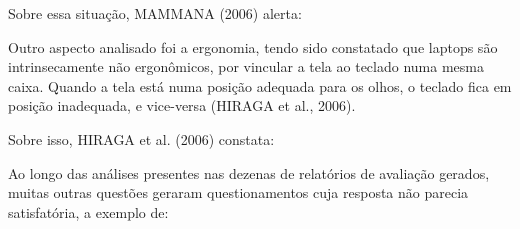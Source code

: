 \documentclass[
12pt,		%
openright,	%
twoside,  %
a4paper,			%
chapter=TITLE,		%
english,			%
french,				%
spanish,			%
brazil				%
]{USPSC-classe/USPSC}
\begin{document}
Sobre essa situa\c{c}\~ao,  MAMMANA (2006) alerta:










\noindent\begin{center}\mbox{\centering{}}\end{center}


Outro aspecto analisado foi a ergonomia, tendo sido constatado que laptops s\~ao intrinsecamente n\~ao ergon\^omicos, por vincular a tela ao teclado numa mesma \textquotedbl caixa\textquotedbl . Quando a tela est\'a numa posi\c{c}\~ao adequada para os olhos, o teclado fica em posi\c{c}\~ao inadequada, e vice-versa  (HIRAGA et al., 2006).









Sobre isso,  HIRAGA et al. (2006) constata:










\noindent\begin{center}\mbox{\centering{}}\end{center}


Ao longo das an\'alises presentes nas dezenas de relat\'orios de avalia\c{c}\~ao gerados, muitas outras quest\~oes geraram questionamentos cuja resposta n\~ao parecia satisfat\'oria, a exemplo de:
\end{document}
